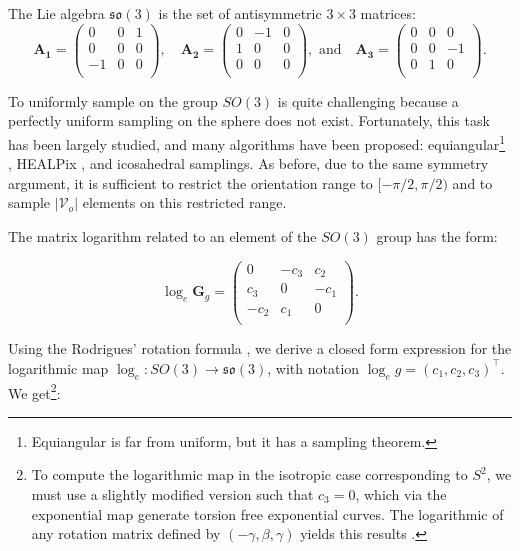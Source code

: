 \documentclass{article}
\begin{document}
The Lie algebra $\mathfrak{so}(3)$ is the set of antisymmetric $3 \times 3$ matrices:
\begin{equation}
\boldsymbol{A_1} = 
\left(
\begin{array}{ccc}
0 & 0 & 1 \\
0 & 0 & 0 \\
-1 & 0 & 0 \\
\end{array}
\right)
,\quad
\boldsymbol{A_2} = 
\left(
\begin{array}{ccc}
0 & -1 & 0  \\
1 & 0 & 0 \\
0 & 0 & 0 \\
\end{array}
\right)
, \text{ and} \quad
\boldsymbol{A_3} = 
\left(
\begin{array}{ccc}
0 & 0 & 0 \\
0 & 0 & -1 \\
0 & 1 & 0 \\
\end{array}
\right).
\end{equation}

To uniformly sample on the group $SO(3)$ is quite challenging because a perfectly uniform sampling on the sphere does not exist. Fortunately, this task has been largely studied, and many algorithms have been proposed: equiangular\footnote{Equiangular is far from uniform, but it has a sampling theorem.} \citep{driscoll1994computing}, HEALPix \citep{gorski2005healpix}, and icosahedral \citep{baumgardner1985icosahedral} samplings. As before, due to the same symmetry argument, it is sufficient to restrict the orientation range to $[-\pi/2, \pi/2)$ and to sample $|\mathcal{V}_o|$ elements on this restricted range.

The matrix logarithm related to an element of the $SO(3)$ group has the form:

\begin{equation}
\log_e \boldsymbol{G}_g = 
\left(
\begin{array}{ccc}
0 & -c_3 & c_2 \\
c_3 & 0 & -c_1 \\
-c_2 & c_1 & 0 \\
\end{array}
\right).
\end{equation}

Using the Rodrigues' rotation formula \citep{rodrigues1840lois}, we derive a closed form expression for the logarithmic map $\log_{e} : SO(3) \to \mathfrak{so}(3)$, with notation $\log_{e} g = (c_1, c_2, c_3)^\top$. We get\footnote{To compute the logarithmic map in the isotropic case corresponding to $S^2$, we must use a slightly modified version such that $c_3 = 0$, which via the exponential map generate torsion free exponential curves. The logarithmic of any rotation matrix defined by $(-\gamma, \beta, \gamma)$ yields this results \citep{bekkers2019b, portegies2015new}.}:
\end{document}
